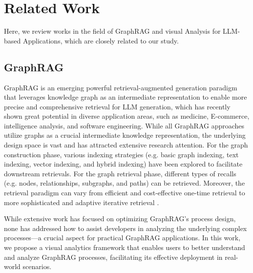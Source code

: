 \section{Related Work}

Here, we review works in the field of GraphRAG and visual Analysis for LLM-based Applications, which are closely related to our study.

\subsection{GraphRAG}

GraphRAG is an emerging powerful retrieval-augmented generation paradigm that leverages knowledge graph as an intermediate representation to enable more precise and comprehensive retrieval for LLM generation, which has recently shown great potential in diverse application areas, such as medicine\cite{DALK}, E-commerce\cite{ecommerce}, intelligence analysis\cite{Ranade_2023}, and software engineering\cite{alhanahnah2024depsragagenticreasoningplanning}. While all GraphRAG approaches utilize graphs as a crucial intermediate knowledge representation, the underlying design space is vast and has attracted extensive research attention. For the graph construction phase, various indexing strategies (e.g. basic graph indexing\cite{gutiérrez2025hipporagneurobiologicallyinspiredlongterm}, text indexing\cite{li2024unioqaunifiedframeworkknowledge}, vector indexing\cite{he2024g}, and hybrid indexing\cite{sarmah2024hybridrag}) have been explored to facilitate downstream retrievals. For the graph retrieval phase, different types of recalls (e.g. nodes\cite{li2024graphneuralnetworkenhanced}, relationships\cite{li2024unioqaunifiedframeworkknowledge}, subgraphs\cite{edge2024local}, and paths\cite{ma2024think}) can be retrieved. Moreover, the retrieval paradigm can vary from efficient and cost-effective one-time retrieval \cite{he2024g, gutiérrez2025hipporagneurobiologicallyinspiredlongterm} to more sophisticated and adaptive iterative retrieval \cite{ma2024think, sun2023thinkongraph}.

While extensive work has focused on optimizing GraphRAG's process design, none has addressed how to assist developers in analyzing the underlying complex processes—a crucial aspect for practical GraphRAG applications. In this work, we propose a visual analytics framework that enables users to better understand and analyze GraphRAG processes, facilitating its effective deployment in real-world scenarios.

